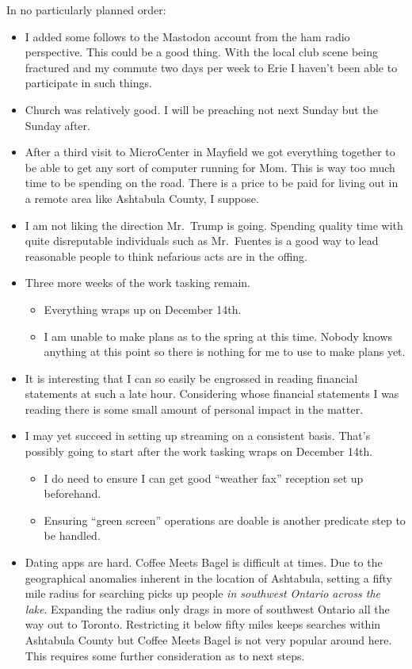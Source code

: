In no particularly planned order:

\begin{itemize}
\tightlist
\item
  I added some follows to the Mastodon account from the ham radio
  perspective. This could be a good thing. With the local club scene
  being fractured and my commute two days per week to Erie I haven't
  been able to participate in such things.
\item
  Church was relatively good. I will be preaching not next Sunday but
  the Sunday after.
\item
  After a third visit to MicroCenter in Mayfield we got everything
  together to be able to get any sort of computer running for Mom. This
  is way too much time to be spending on the road. There is a price to
  be paid for living out in a remote area like Ashtabula County, I
  suppose.
\item
  I am not liking the direction Mr.~Trump is going. Spending quality
  time with quite disreputable individuals such as Mr.~Fuentes is a good
  way to lead reasonable people to think nefarious acts are in the
  offing.
\item
  Three more weeks of the work tasking remain.

  \begin{itemize}
  \tightlist
  \item
    Everything wraps up on December 14th.
  \item
    I am unable to make plans as to the spring at this time. Nobody
    knows anything at this point so there is nothing for me to use to
    make plans yet.
  \end{itemize}
\item
  It is interesting that I can so easily be engrossed in reading
  financial statements at such a late hour. Considering whose financial
  statements I was reading there is some small amount of personal impact
  in the matter.
\item
  I may yet succeed in setting up streaming on a consistent basis.
  That's possibly going to start after the work tasking wraps on
  December 14th.

  \begin{itemize}
  \tightlist
  \item
    I do need to ensure I can get good ``weather fax'' reception set up
    beforehand.
  \item
    Ensuring ``green screen'' operations are doable is another predicate
    step to be handled.
  \end{itemize}
\item
  Dating apps are hard. Coffee Meets Bagel is difficult at times. Due to
  the geographical anomalies inherent in the location of Ashtabula,
  setting a fifty mile radius for searching picks up people \emph{in
  southwest Ontario across the lake}. Expanding the radius only drags in
  more of southwest Ontario all the way out to Toronto. Restricting it
  below fifty miles keeps searches within Ashtabula County but Coffee
  Meets Bagel is not very popular around here. This requires some
  further consideration as to next steps.
\end{itemize}
